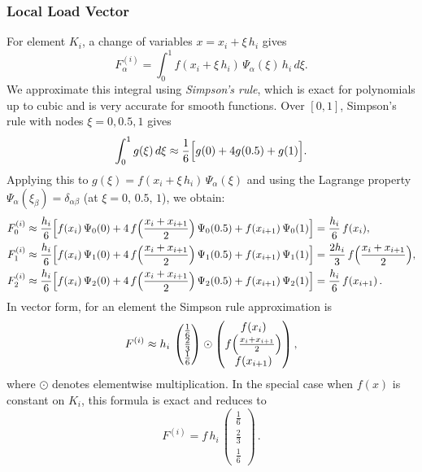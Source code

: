 \documentclass[a4paper,10pt]{article}
\begin{document}
\subsubsection{Local Load Vector}

For element \(K_i\), a change of variables \(x = x_i + \xi\,h_i\) gives
\[
	F^{(i)}_\alpha = \int_{0}^{1} f(x_i+\xi\,h_i)\,\Psi_\alpha(\xi)\,h_i\,d\xi.
\]
We approximate this integral using \emph{Simpson's rule}, which is exact for polynomials up to cubic and is very accurate for smooth functions. Over \([0,1]\), Simpson's rule with nodes \(\xi=0,0.5,1\) gives
\[
	\int_0^1 g(\xi)\,d\xi \approx \frac{1}{6}\Bigl[g(0) + 4g(0.5) + g(1)\Bigr].
\]
Applying this to \(g(\xi)=f(x_i+\xi\,h_i)\,\Psi_\alpha(\xi)\) and using the Lagrange property \(\Psi_\alpha(\xi_\beta)=\delta_{\alpha\beta}\) (at \(\xi=0,\,0.5,\,1\)), we obtain:
\begin{align*}
	F^{(i)}_0 & \approx \frac{h_i}{6}\Bigl[f(x_i)\,\Psi_0(0) + 4\,f\Bigl(\frac{x_i+x_{i+1}}{2}\Bigr)\,\Psi_0(0.5) + f(x_{i+1})\,\Psi_0(1)\Bigr] = \frac{h_i}{6}\,f(x_i),                              \\
	F^{(i)}_1 & \approx \frac{h_i}{6}\Bigl[f(x_i)\,\Psi_1(0) + 4\,f\Bigl(\frac{x_i+x_{i+1}}{2}\Bigr)\,\Psi_1(0.5) + f(x_{i+1})\,\Psi_1(1)\Bigr] = \frac{2h_i}{3}\,f\Bigl(\frac{x_i+x_{i+1}}{2}\Bigr), \\
	F^{(i)}_2 & \approx \frac{h_i}{6}\Bigl[f(x_i)\,\Psi_2(0) + 4\,f\Bigl(\frac{x_i+x_{i+1}}{2}\Bigr)\,\Psi_2(0.5) + f(x_{i+1})\,\Psi_2(1)\Bigr] = \frac{h_i}{6}\,f(x_{i+1})\,.
\end{align*}
In vector form, for an element the Simpson rule approximation is
\[
	F^{(i)} \approx h_i\,
	\begin{pmatrix}
		\tfrac{1}{6} \\
		\tfrac{2}{3} \\
		\tfrac{1}{6}
	\end{pmatrix}
	\odot
	\begin{pmatrix}
		f(x_i)                             \\
		f\Bigl(\frac{x_i+x_{i+1}}{2}\Bigr) \\
		f(x_{i+1})
	\end{pmatrix},
\]
where \(\odot\) denotes elementwise multiplication. In the special case when \(f(x)\) is constant on \(K_i\), this formula is exact and reduces to
\[
	F^{(i)} = f\,h_i\,\begin{pmatrix}\tfrac{1}{6} \\[1mm] \tfrac{2}{3} \\[1mm] \tfrac{1}{6}\end{pmatrix}\,.
\]
\end{document}
